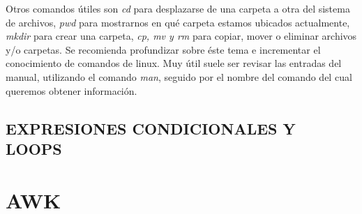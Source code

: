 Otros comandos útiles son \textit{cd} para desplazarse de una carpeta a otra del sistema de archivos, \textit{pwd} para mostrarnos
en qué carpeta estamos ubicados actualmente, \textit{mkdir} para crear una carpeta, \textit{cp, mv y rm} para copiar, mover o eliminar
archivos y/o carpetas. Se recomienda profundizar sobre éste tema e incrementar el conocimiento de comandos de linux. Muy útil suele ser revisar
las entradas del manual, utilizando el comando \textit{man}, seguido por el nombre del comando del cual queremos obtener información.

\subsection{EXPRESIONES CONDICIONALES Y LOOPS}




\section{AWK}